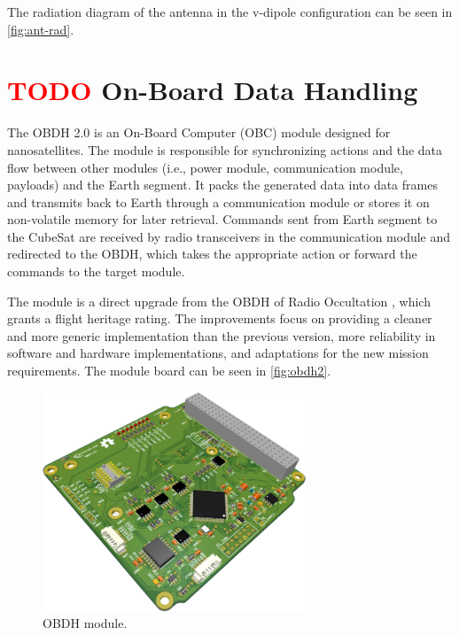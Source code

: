 The radiation diagram of the antenna in the v-dipole configuration can be seen in \autoref{fig:ant-rad}.

\section{ \textcolor{red}{TODO} On-Board Data Handling}

The OBDH 2.0 is an On-Board Computer (OBC) module designed for nanosatellites. The module is responsible for synchronizing actions and the data flow between other modules (i.e., power module, communication module, payloads) and the Earth segment. It packs the generated data into data frames and transmits back to Earth through a communication module or stores it on non-volatile memory for later retrieval. Commands sent from Earth segment to the CubeSat are received by radio transceivers in the communication module and redirected to the OBDH, which takes the appropriate action or forward the commands to the target module.

The module is a direct upgrade from the OBDH of Radio Occultation \cite{floripasat}, which grants a flight heritage rating. The improvements focus on providing a cleaner and more generic implementation than the previous version, more reliability in software and hardware implementations, and adaptations for the new mission requirements. The module board can be seen in \autoref{fig:obdh2}.

\begin{figure}[!ht]
    \begin{center}
        \includegraphics[width=0.7\textwidth]{figures/subsystems/obdh2-pcb-3d}
        \caption{OBDH module.}
        \label{fig:obdh2}
    \end{center}
\end{figure}


